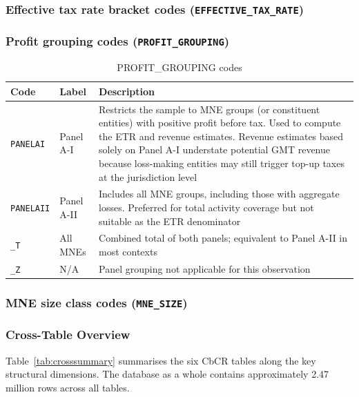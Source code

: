 \documentclass[11pt,a4paper]{article}
\newcommand{\code}[1]{\texttt{#1}}
\begin{document}
\subsubsection{Effective tax rate bracket codes (\texttt{EFFECTIVE\_TAX\_RATE})}


\subsubsection{Profit grouping codes (\texttt{PROFIT\_GROUPING})}

\begin{table}[H]
\centering
\caption{PROFIT\_GROUPING codes}
\label{tab:panelgroups}
\begin{tabular}{@{}llp{9cm}@{}}
\toprule
Code & Label & Description \\
\midrule
\code{PANELAI} & Panel A-I & Restricts the sample to MNE groups (or constituent entities) with positive profit before tax. Used to compute the ETR and revenue estimates. Revenue estimates based solely on Panel A-I understate potential GMT revenue because loss-making entities may still trigger top-up taxes at the jurisdiction level \\
\code{PANELAII} & Panel A-II & Includes all MNE groups, including those with aggregate losses. Preferred for total activity coverage but not suitable as the ETR denominator \\
\code{\_T} & All MNEs & Combined total of both panels; equivalent to Panel A-II in most contexts \\
\code{\_Z} & N/A & Panel grouping not applicable for this observation \\
\bottomrule
\end{tabular}
\end{table}

\subsubsection{MNE size class codes (\texttt{MNE\_SIZE})}



\subsubsection{Cross-Table Overview}\label{sec:crossoverview}

Table~\ref{tab:crosssummary} summarises the six CbCR tables along the key structural dimensions. The database as a whole contains approximately 2.47 million rows across all tables. 
\end{document}
